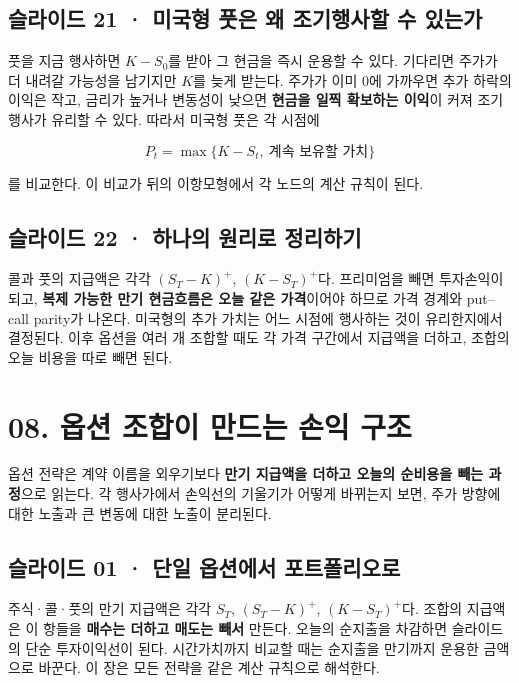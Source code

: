 \documentclass[11pt,a4paper]{article}
\begin{document}
\subsection{슬라이드 21 · 미국형 풋은 왜 조기행사할 수 있는가}
풋을 지금 행사하면 $K-S_0$를 받아 그 현금을 즉시 운용할 수 있다. 기다리면 주가가 더 내려갈 가능성을 남기지만 $K$를 늦게 받는다. 주가가 이미 0에 가까우면 추가 하락의 이익은 작고, 금리가 높거나 변동성이 낮으면 \textbf{현금을 일찍 확보하는 이익}이 커져 조기행사가 유리할 수 있다. 따라서 미국형 풋은 각 시점에\par

\[
P_t=\max\{K-S_t,\ \text{계속 보유할 가치}\}
\]

를 비교한다. 이 비교가 뒤의 이항모형에서 각 노드의 계산 규칙이 된다.\par

\subsection{슬라이드 22 · 하나의 원리로 정리하기}
콜과 풋의 지급액은 각각 $(S_T-K)^+$, $(K-S_T)^+$다. 프리미엄을 빼면 투자손익이 되고, \textbf{복제 가능한 만기 현금흐름은 오늘 같은 가격}이어야 하므로 가격 경계와 put–call parity가 나온다. 미국형의 추가 가치는 어느 시점에 행사하는 것이 유리한지에서 결정된다. 이후 옵션을 여러 개 조합할 때도 각 가격 구간에서 지급액을 더하고, 조합의 오늘 비용을 따로 빼면 된다.\par

\section{08. 옵션 조합이 만드는 손익 구조}
옵션 전략은 계약 이름을 외우기보다 \textbf{만기 지급액을 더하고 오늘의 순비용을 빼는 과정}으로 읽는다. 각 행사가에서 손익선의 기울기가 어떻게 바뀌는지 보면, 주가 방향에 대한 노출과 큰 변동에 대한 노출이 분리된다.\par

\subsection{슬라이드 01 · 단일 옵션에서 포트폴리오로}
주식·콜·풋의 만기 지급액은 각각 $S_T$, $(S_T-K)^+$, $(K-S_T)^+$다. 조합의 지급액은 이 항들을 \textbf{매수는 더하고 매도는 빼서} 만든다. 오늘의 순지출을 차감하면 슬라이드의 단순 투자이익선이 된다. 시간가치까지 비교할 때는 순지출을 만기까지 운용한 금액으로 바꾼다. 이 장은 모든 전략을 같은 계산 규칙으로 해석한다.\par
\end{document}
